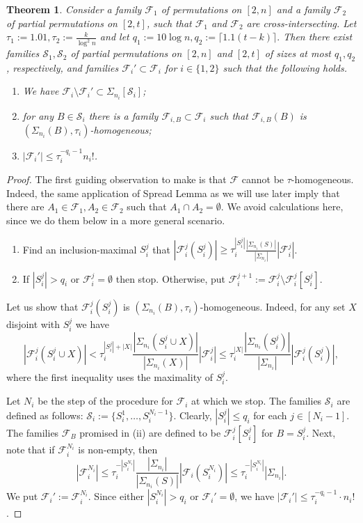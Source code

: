 \documentclass[10pt,a4paper]{amsart}
\newtheorem{thm}{Theorem}
\newcommand{\FF}{\mathcal{F}}
\newcommand{\ff}{\mathcal{F}}
\newcommand{\m}{\mathcal}
\begin{document}
\begin{thm}\label{thmapprox}
    Consider a family $\FF_1$  of permutations on $[2,n]$ and a family $\ff_2$ of partial permutations on $[2,t]$, such that $\FF_1$ and $\FF_2$ are cross-intersecting. 
    Let $\tau_1 := 1.01, \tau_2:=\frac{k}{\log^2{n}}$ and let $q_1:=10\log{n}, q_2:=\lceil1.1(t-k)\rceil.$ Then there exist families $\m{S}_1, \m S_2$ of partial permutations on  $[2,n]$ and $[2,t]$ of sizes at most $q_1,q_2$, respectively, and families $\FF_i' \subset \FF_i$ for $i\in\{1,2\}$ such that the following holds.
    \begin{enumerate}[label=(\roman*)]
        \item We have $\FF_i \setminus \FF_i'\subset \Sigma_{n_i}[\m S_i]$;
        \item for any $B \in \m{S}_i$ there is a family $\FF_{i, B} \subset \FF_i$ such that $\FF_{i,B}(B)$ is $(\Sigma_{n_i}(B), \tau_i)$-homogeneous;
        \item $|\FF_i'| \leq \tau_i^{-q_i-1}n_i!$.
    \end{enumerate}
\end{thm}

\begin{proof} The first guiding observation to make is that $\FF$ cannot be $\tau$-homogeneous.  
Indeed, the same application of Spread Lemma as we will use later imply that there are $A_1 \in \FF_1, A_2 \in \FF_2$ such that $A_1 \cap A_2=\emptyset$. We avoid calculations here, since we do them below in a more general scenario.  

\begin{enumerate}
    \item Find an inclusion-maximal $S_i^{j}$ that  $|\FF_{i}^j(S_i^{j})| \ge  \tau^{|S_i^{j}|}_i \frac{|\Sigma_{n_i}(S)|}{|\Sigma_{n_i}|}|\FF_i^{j}|$.
    \item If $|S_i^{j}|> q_i$ or $\FF_{i}^j = \emptyset$ then stop. Otherwise, put $\FF_{i}^{j+1}:=\FF_{i}^j\setminus \FF_{i}^{j}[S_i^{j}]$. 
\end{enumerate}
Let us show that $\FF_{i}^j(S_i^{j})$ is $(\Sigma_{n_i}(B), \tau_i)$-homogeneous. Indeed, for any set $X$ disjoint with $S_i^j$ we have
$$|\FF_{i}^j(S_i^{j}\cup X)|< \tau_i^{|S_i^{j}|+|X|} \frac{|\Sigma_{n_i}(S_i^j\cup X)|}{|\Sigma_{n_i}(X)|} |\ff_i^j|\le \tau_i^{|X|} \frac{|\Sigma_{n_i}(S_i^j)|}{|\Sigma_{n_i}|} |\FF_{i}^j (S_i^{j})|,$$
where the first inequality uses the maximality of $S_i^j.$

Let $N_i$ be the step of the procedure for $\FF_i$ at which we stop. The families $\m{S}_i$ are defined as follows: $\m{S}_i:=\{S_i^{1},\ldots, S_i^{N_i-1}\}$. Clearly, $|S_i^{j}|\le q_i$ for each $j\in [N_i-1]$. The families $\FF_{B}$ promised in (ii) are defined to be $\FF_{i}^j[S_i^j]$ for $B=S_i^j$. Next, note that if $\FF_i^{N_i}$ is non-empty, then 
$$
|\FF_{i}^{N_i}|\le \tau_i^{-|S_i^{N_i}|} \frac{|\Sigma_{n_i}|}{|\Sigma_{n_i}(S)|}|\FF_i(S_i^{N_i})|\le \tau_i^{-|S_i^{N_i}|}|\Sigma_{n_i}|.
$$
We put $\FF_i':=\FF_i^{N_i}$. Since either $|S_i^{N_i}|>q_i$ or $\FF_i' = \emptyset $, we have $|\FF_i'| \leq \tau^{-q_i-1}_i \cdot n_i!$.
\end{proof}
\end{document}
